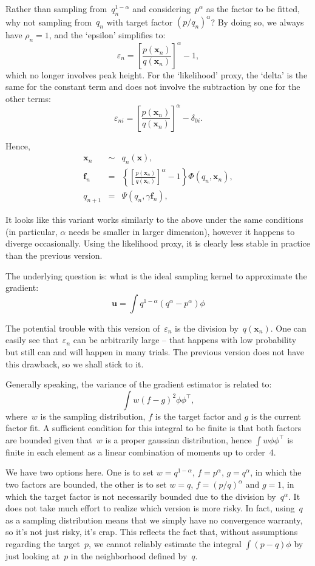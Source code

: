 \documentclass{article}
\def\x{\mathbf{x}}
\def\u{\mathbf{u}}
\def\f{\mathbf{f}}
\begin{document}
Rather than sampling from~$q_n^{1-\alpha}$ and considering~$p^\alpha$ as the factor to be fitted, why not sampling from~$q_n$ with target factor $(p/q_n)^\alpha$? By doing so, we always have $\rho_n=1$, and the `epsilon' simplifies to:
$$
\varepsilon_n = 
\left[\frac{p(\x_n)}{q(\x_n)}\right]^\alpha -1 ,
$$
which no longer involves peak height. For the `likelihood' proxy, the `delta' is the same for the constant term and does not involve the subtraction by one for the other terms:
$$
\varepsilon_{ni} = 
\left[\frac{p(\x_n)}{q(\x_n)}\right]^\alpha - \delta_{0i}.
$$

Hence,   
\begin{eqnarray*}
\x_n & \sim & q_n(\x),\\
\f_n & = & \left\{\left[\frac{p(\x_n)}{q(\x_n)}\right]^\alpha -1 \right\} \Phi(q_n, \x_n),\\
q_{n+1} & = & \Psi(q_n, \gamma \f_n),
\end{eqnarray*}

It looks like this variant works similarly to the above under the same conditions (in particular, $\alpha$ needs be smaller in larger dimension), however it happens to diverge occasionally. Using the likelihood proxy, it is clearly less stable in practice than the previous version. 

The underlying question is: what is the ideal sampling kernel to approximate the gradient:
$$
\u = \int q^{1-\alpha} (q^\alpha-p^\alpha) \phi
$$

The potential trouble with this version of~$\varepsilon_n$ is the division by~$q(\x_n)$. One can easily see that~$\varepsilon_n$ can be arbitrarily large -- that happens with low probability but still can and will happen in many trials. The previous version does not have this drawback, so we shall stick to it. 

Generally speaking, the variance of the gradient estimator is related to:
$$
\int w(f-g)^2 \phi\phi^\top,
$$
where~$w$ is the sampling distribution, $f$ is the target factor and $g$ is the current factor fit. A sufficient condition for this integral to be finite is that both factors are bounded given that~$w$ is a proper gaussian distribution, hence $\int w \phi\phi^\top$ is finite in each element as a linear combination of moments up to order~4.

We have two options here. One is to set $w=q^{1-\alpha}$, $f=p^\alpha$, $g=q^\alpha$, in which the two factors are bounded, the other is to set $w=q$, $f=(p/q)^\alpha$ and $g=1$, in which the target factor is not necessarily bounded due to the division by~$q^\alpha$. It does not take much effort to realize which version is more risky. In fact, using~$q$ as a sampling distribution means that we simply have no convergence warranty, so it's not just risky, it's crap. This reflects the fact that, without assumptions regarding the target~$p$, we cannot reliably estimate the integral $\int (p-q)\phi$ by just looking at~$p$ in the neighborhood defined by~$q$.
\end{document}
